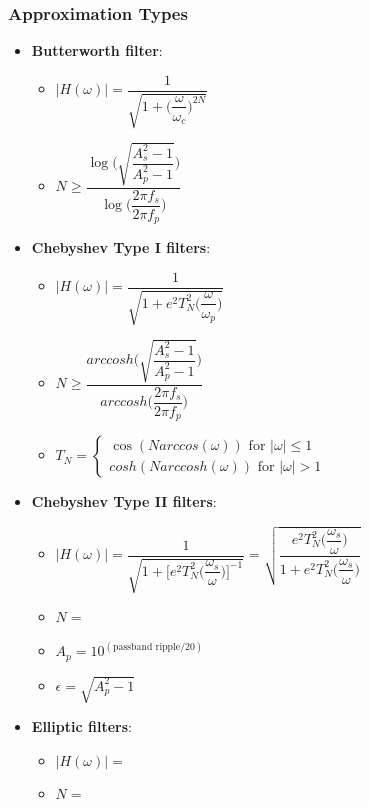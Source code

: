 \newpage
\subsubsection{Approximation Types}
\begin{itemize}
    \item \textbf{Butterworth filter}:
    \begin{itemize}
	\item $|H(\omega)| = \dfrac{1}{\sqrt{1+\big(\dfrac{\omega}{\omega_c}\big)^{2N}}}$
	\item $N\geq \dfrac{\log\Big(\sqrt{\dfrac{A_s^2-1}{A_p^2-1}}\Big)}{\log\big(\dfrac{2\pi f_s}{2\pi f_p}\big)}$
    \end{itemize}
    \item \textbf{Chebyshev Type I filters}: %
    \begin{itemize}
	\item $|H(\omega)|=\dfrac{1}{\sqrt{1+e^2T_N^2\big(\dfrac{\omega}{\omega_p}\big)}}$
	\item $N\geq \dfrac{arccosh\Big(\sqrt{\dfrac{A_s^2-1}{A_p^2-1}}\Big)}{arccosh\big(\dfrac{2\pi f_s}{2\pi f_p}\big)}$
    \item $T_N=\left\{\begin{array}{ll}
        \cos(N arccos(\omega)) \text{ for } |\omega|\leq 1 \\
        cosh(N arccosh(\omega)) \text{ for } |\omega|> 1 
    \end{array}\right.$
    \end{itemize}
    \item \textbf{Chebyshev Type II filters}:
    \begin{itemize}
	\item $|H(\omega)|
    = \dfrac{1}{\sqrt{1+\big[e^2T_N^2\big(\dfrac{\omega_s}{\omega}\big)\big]^{-1}}} 
    = \sqrt{\dfrac{e^2T_N^2\big(\dfrac{\omega_s}{\omega}\big)}{1+e^2T_N^2\big(\dfrac{\omega_s}{\omega}\big)}}$
	\item $N = $
    \item $A_p = 10^{(\text{passband ripple}/20)}$
    \item $\epsilon = \sqrt{A_p^2-1}$
    \end{itemize}
    \item \textbf{Elliptic filters}:
    \begin{itemize}
	\item $|H(\omega)|=$
	\item $N=$
    \end{itemize}
\end{itemize}


